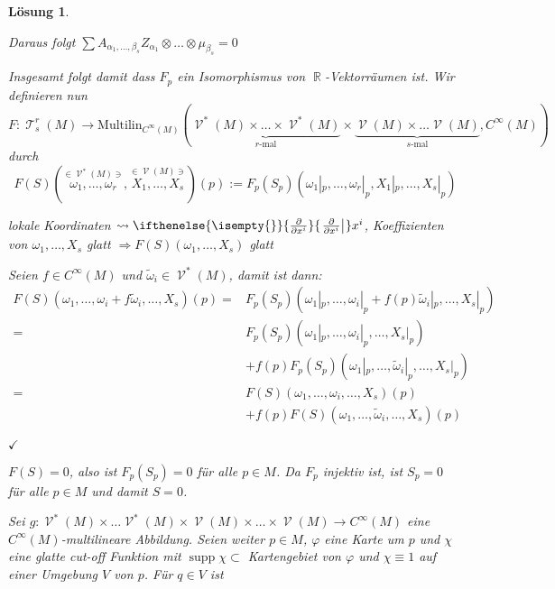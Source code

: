 \documentclass[paper=A4, twoside, chapterprefix=true, bibliography=totoc, headsepline]{scrbook}
\let\temp\phi{}
\let\phi\varphi{}
\let\varphi\temp{}
\let\temp\theta{}
\let\theta\vartheta{}
\let\vartheta\temp{}
\let\temp\epsilon{}
\let\epsilon\varepsilon{}
\let\varepsilon\temp{}
\let\temp\rho{}
\let\rho\varrho{}
\let\varrho\temp{}
\DeclareMathOperator{\R}{\mathbb{R}}
\DeclareMathOperator{\calT}{\mathcal{T}}
\DeclareMathOperator{\calV}{\mathcal{V}}
\DeclareMathOperator{\supp}{supp}   %
\newcommand{\X}{\times}
\newcommand{\pdifffrac}[3][]{\ifthenelse{\isempty{#1}}{\frac{\partial #2}{\partial #3}}{\left. \frac{\partial #2}{\partial #3} \right|_{#1}}}
\theoremstyle{plain}
\theoremstyle{nonumberplain}
\theoremstyle{empty}
\theoremstyle{break}
\newtheorem{Loes}{L\"osung}
\newcommand{\quot}[1]{\textrm{\glqq}{#1}\textrm{\grqq}}
\begin{document}
\begin{Loes}
\begin{description}[leftmargin=*]
	Daraus folgt $\sum A_{\alpha_1,\ldots ,\beta_s} Z_{\alpha_1} \otimes \ldots \otimes \mu_{\beta_s} = 0$
\end{description}
Insgesamt folgt damit dass $F_p$ ein Isomorphismus von $\R$-Vektorr\"aumen ist. Wir definieren nun
	\[ F: \calT_s^r(M) \to \text{Multilin}_{C^\infty(M)}(\underbrace{\calV^*(M) \X \ldots \X \calV^*(M)}_{r\text{-mal}} \X \underbrace{\calV(M) \X \ldots \calV(M)}_{s\text{-mal}}, C^\infty(M)) \]
durch
	\[ F(S)(\overset{\in \calV^*(M) \ni}{\omega_1,\ldots ,\omega_r}, \overset{\in \calV(M) \ni}{X_1,\ldots ,X_s})(p) := F_p(S_p)(\omega_1|_p,\ldots ,\omega_r|_p, X_1|_p,\ldots ,X_s|_p) \]
\begin{description}[leftmargin=*]
\item[$\bm{F(S)(\omega_1,\ldots ,X_s) \in C^\infty(M)}$:]
	lokale Koordinaten $\leadsto \pdifffrac{}{x^{i}} x^{i}$, Koeffizienten von $\omega_1, \ldots ,X_s$ glatt $\Rightarrow F(S)(\omega_1,\ldots ,X_s)$ glatt
\item[$\bm{F(S)}$ ist $\bm{C^\infty(M)}$-multilinear:]
	Seien $f \in C^\infty(M)$ und $\tilde\omega_i \in \calV^*(M)$, damit ist dann:
	\begin{align*}
		F(S)(\omega_1,\ldots ,\omega_i + f \tilde\omega_i, \ldots ,X_s)(p) ={}& F_p(S_p)(\omega_1|_p,\ldots ,\omega_i|_p + f(p)\tilde\omega_i|_p,\ldots ,X_s|_p)\\
		={}& F_p(S_p)(\omega_1|_p,\ldots ,\omega_i|_p,\ldots ,X_s|_p)\\
		 & + f(p)F_p(S_p)(\omega_1|_p,\ldots ,\tilde\omega_i|_p,\ldots ,X_s|_p)\\
		={}& F(S)(\omega_1,\ldots ,\omega_i,\ldots ,X_s)(p)\\
		 & + f(p)F(S)(\omega_1,\ldots ,\tilde\omega_i,\ldots ,X_s)(p)
	\end{align*}
\item[$\bm{F}$ ist $\bm{C^\infty(M)}$-linear] $\checkmark$
\item[$\bm{F}$ ist injektiv:]
	$F(S) = 0$, also ist $F_p(S_p) = 0$ f\"ur alle $p \in M$. Da $F_p$ injektiv ist, ist $S_p = 0$ f\"ur alle $p \in M$ und damit $S = 0$.
\item[$\bm{F}$ ist surjektiv:]
	Sei $g: \calV^*(M) \X \ldots \calV^*(M) \X \calV(M) \X \ldots \X \calV(M) \to C^\infty(M)$ eine $C^\infty(M)$-multilineare Abbildung. Seien weiter $p \in M$, $\phi$ eine Karte um $p$ und $\chi$ eine glatte cut-off Funktion mit $\supp \chi \subset$\marginnote{\scriptsize{$\supp$ \quot{Tr\"ager}}} Kartengebiet von $\phi$ und $\chi \equiv 1$ auf einer Umgebung $V$ von $p$. F\"ur $q \in V$ ist

\end{description}
\end{Loes}
\end{document}

